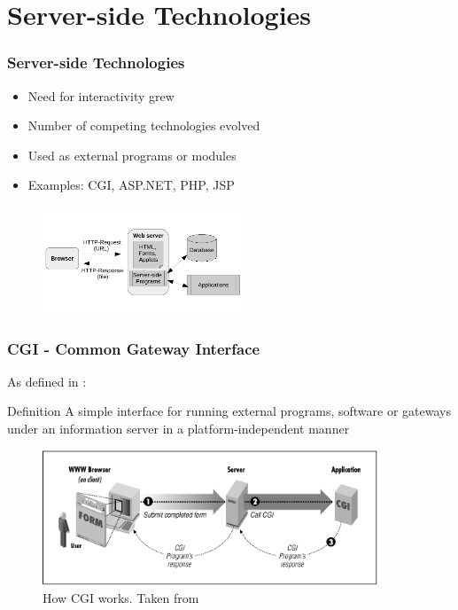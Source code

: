 \documentclass[9pt]{beamer}
\begin{document}
\section{Server-side Technologies}
\begin{frame}
\begin{multicols}{2}
\frametitle<presentation>{Server-side Technologies}
  \begin{itemize}
    \item Need for interactivity grew
    \item Number of competing technologies evolved
    \item Used as external programs or modules
    \item Examples: CGI, ASP.NET, PHP, JSP
  \end{itemize}
  
  \begin{figure}[h]
    \centerline{\includegraphics[width=6cm]{pics/webclient.pdf}}
  \end{figure}
\end{multicols}

\end{frame}

\begin{frame}
\frametitle<presentation>{CGI - Common Gateway Interface}
  As defined in \cite{cgiSpecs}:

  \begin{block}{Definition}
    A simple interface for running external programs, software or gateways under an information server in a platform-independent manner
  \end{block}

  \begin{figure}[h]
    \centerline{\includegraphics[width=10cm]{pics/cgi.png}}
    \caption{How CGI works. Taken from \cite{gundavaram1996cgi}}
    \label{fig-cgi}
  \end{figure}

\end{frame}
\end{document}
